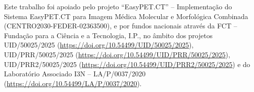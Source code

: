 \documentclass[11pt,twoside,a4paper]{report}
\begin{document}
        \vspace*{60mm}
    \TEXT{}
{Este trabalho foi apoiado pelo projeto ``EasyPET.CT'' -- Implementação do Sistema EasyPET.CT para Imagem Médica Molecular e Morfológica Combinada (CENTRO2030-FEDER-02363500), e por fundos nacionais através da FCT -- Fundação para a Ciência e a Tecnologia, I.P., no âmbito dos projetos UID/50025/2025 (\url{https://doi.org/10.54499/UID/50025/2025}), UID/PRR/50025/2025 (\url{https://doi.org/10.54499/UID/PRR/50025/2025}), UID/PRR2/50025/2025 (\url{https://doi.org/10.54499/UID/PRR2/50025/2025}) e do Laboratório Associado I3N -- LA/P/0037/2020 (\url{https://doi.org/10.54499/LA/P/0037/2020}).
       }
\vspace*{2mm}
\begin{figure}[H]
\begin{minipage}{1.4\textwidth}


 \end{minipage}
\end{figure}
\EndTitlePage
\end{document}
